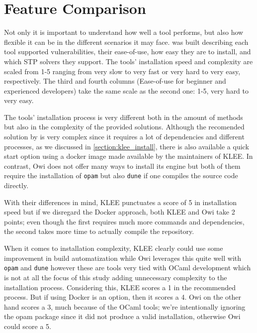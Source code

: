 \section{Feature Comparison}\label{section:feat_comp}

Not only it is important to understand how well a tool performs, but also how flexible it can be in the different scenarios it may face.  was built describing each tool supported vulnerabilities, their ease-of-use, how easy they are to install, and which STP solvers they support. The tools' installation speed and complexity are scaled from 1-5 ranging from very slow to very fast or very hard to very easy, respectively. The third and fourth columns (Ease-of-use for beginner and experienced developers) take the same scale as the second one: 1-5, very hard to very easy.

The tools' installation process is very different both in the amount of methods but also in the complexity of the provided solutions. Although the recomended solution by \citeauthor{klee_install} is very complex since it requires a lot of dependencies and different processes, as we discussed in \cref{section:klee_install}, there is also available a quick start option using a docker image made available by the maintainers of KLEE. In contrast, Owi does not offer many ways to install its engine but both of them require the installation of \lstinline$opam$ but also \lstinline$dune$ if one compiles the source code directly. 

With their differences in mind, KLEE punctuates a score of 5 in installation speed but if we disregard the Docker approach, both KLEE and Owi take 2 points; even though the first requires much more commands and dependencies, the second takes more time to actually compile the repository.

When it comes to installation complexity, KLEE clearly could use some improvement in build automatization while Owi leverages this quite well with \lstinline$opam$ and \lstinline$dune$ however these are tools very tied with OCaml development which is not at all the focus of this study adding unnecessary complexity to the installation process. Considering this, KLEE scores a 1 in the recommended process. But if using Docker is an option, then it scores a 4. Owi on the other hand scores a 3, much because of the OCaml tools; we're intentionally ignoring the opam package since it did not produce a valid installation, otherwise Owi could score a 5.

